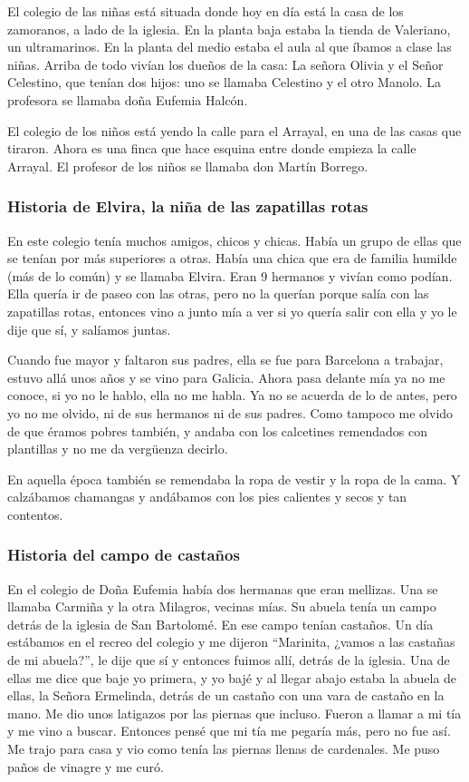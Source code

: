 \documentclass[12pt,a5paper]{book}
\begin{document}
El colegio de las niñas está situada donde hoy en día está la casa de los zamoranos, a lado de la iglesia. En la planta baja estaba la tienda de Valeriano, un ultramarinos. En la planta del medio estaba el aula al que íbamos a clase las niñas. Arriba de todo vivían los dueños de la casa: La señora Olivia y el Señor Celestino, que tenían dos hijos: uno se llamaba Celestino y el otro Manolo. La profesora se llamaba doña Eufemia Halcón.

El colegio de los niños está yendo la calle para el Arrayal, en una de las casas que tiraron. Ahora es una finca que hace esquina entre donde empieza la calle Arrayal. El profesor de los niños se llamaba don Martín Borrego.


\subsubsection*{Historia de Elvira, la niña de las zapatillas rotas}

En este colegio tenía muchos amigos, chicos y chicas. Había un grupo de ellas que se tenían por más superiores a otras. Había una chica que era de familia humilde (más de lo común) y se llamaba Elvira. Eran 9 hermanos y vivían como podían. Ella quería ir de paseo con las otras, pero no la querían porque salía con las zapatillas rotas, entonces vino a junto mía a ver si yo quería salir con ella y yo le dije que sí, y salíamos juntas.

Cuando fue mayor y faltaron sus padres, ella se fue para Barcelona a trabajar, estuvo allá unos años y se vino para Galicia. Ahora pasa delante mía ya no me conoce, si yo no le hablo, ella no me habla. Ya no se acuerda de lo de antes, pero yo no me olvido, ni de sus hermanos ni de sus padres. Como tampoco me olvido de que éramos pobres también, y andaba con los calcetines remendados con plantillas y no me da vergüenza decirlo.

En aquella época también se remendaba la ropa de vestir y la ropa de la cama. Y calzábamos chamangas y andábamos con los pies calientes y secos y tan contentos.


\subsubsection*{Historia del campo de castaños}

En el colegio de Doña Eufemia había dos hermanas que eran mellizas. Una se llamaba Carmiña y la otra Milagros, vecinas mías. Su abuela tenía un campo detrás de la iglesia de San Bartolomé. En ese campo tenían castaños. Un día estábamos en el recreo del colegio y me dijeron “Marinita, ¿vamos a las castañas de mi abuela?”, le dije que sí y entonces fuimos allí, detrás de la iglesia. Una de ellas me dice que baje yo primera, y yo bajé y al llegar abajo estaba la abuela de ellas, la Señora Ermelinda, detrás de un castaño con una vara de castaño en la mano. Me dio unos latigazos por las piernas que incluso. Fueron a llamar a mi tía y me vino a buscar. Entonces pensé que mi tía me pegaría más, pero no fue así. Me trajo para casa y vio como tenía las piernas llenas de cardenales. Me puso paños de vinagre y me curó.
\end{document}
